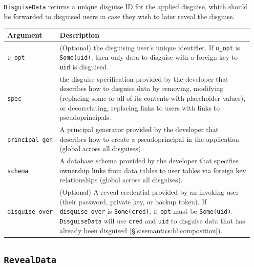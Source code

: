    \texttt{DisguiseData} returns a unique disguise ID for the applied disguise, which should be
    forwarded to disguised users in case they wish to later reveal the
    disguise.

    \begin{center}
    \begin{longtable}{|m{}|m{}|}
        \hline
        \textbf{Argument} & \textbf{Description} \\
        \hline
        \texttt{u\_opt}& (Optional) the disguising user's unique identifier. If
            \texttt{u\_opt} is \texttt{Some(uid)}, then only data to disguise with
            a foreign key to \texttt{uid} is disguised.\\

        \hline
        \texttt{spec}& the disguise specification provided by the
            developer that describes how to disguise data by
    removing, modifying (replacing some or all of its contents with placeholder
    values), or decorrelating, replacing links to users with links to
    pseudoprincipals.\\

        \hline
        \texttt{principal\_gen}& A principal generator provided by the developer
    that describes how to create a pseudoprincipal in the application (global
            across all disguises).\\
        \hline
        \texttt{schema}& A database schema provided by the developer that specifies
    ownership links from data tables to user tables via foreign key
    relationships (global across all disguises).\\

        \hline
        \texttt{disguise\_over}& (Optional) A reveal credential provided by an
        invoking user (their password, private key, or backup token).
    If \texttt{disguise\_over} is \texttt{Some(cred)}, \texttt{u\_opt} must be
    \texttt{Some(uid)}. \texttt{DisguiseData} will use \texttt{cred} and
    \texttt{uid} to disguise data that has already been disguised
    (\S\ref{s:semantics:hl:composition}).\\
        \hline
    \end{longtable}
    \end{center}

    \subsection{\texttt{RevealData}}

